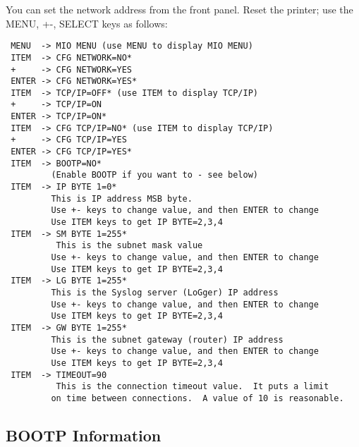 \documentclass[a4paper]{article}
\begin{document}
You can set the network address from the front panel.
Reset  the printer; use the MENU, +-, SELECT keys as follows:
\begin{tscreen}
\begin{verbatim}
 MENU  -> MIO MENU (use MENU to display MIO MENU)
 ITEM  -> CFG NETWORK=NO*
 +     -> CFG NETWORK=YES
 ENTER -> CFG NETWORK=YES*
 ITEM  -> TCP/IP=OFF* (use ITEM to display TCP/IP)
 +     -> TCP/IP=ON
 ENTER -> TCP/IP=ON*
 ITEM  -> CFG TCP/IP=NO* (use ITEM to display TCP/IP)
 +     -> CFG TCP/IP=YES
 ENTER -> CFG TCP/IP=YES*
 ITEM  -> BOOTP=NO*
         (Enable BOOTP if you want to - see below)
 ITEM  -> IP BYTE 1=0*
         This is IP address MSB byte.
         Use +- keys to change value, and then ENTER to change
         Use ITEM keys to get IP BYTE=2,3,4
 ITEM  -> SM BYTE 1=255*
          This is the subnet mask value
         Use +- keys to change value, and then ENTER to change
         Use ITEM keys to get IP BYTE=2,3,4
 ITEM  -> LG BYTE 1=255*
         This is the Syslog server (LoGger) IP address
         Use +- keys to change value, and then ENTER to change
         Use ITEM keys to get IP BYTE=2,3,4
 ITEM  -> GW BYTE 1=255*
         This is the subnet gateway (router) IP address
         Use +- keys to change value, and then ENTER to change
         Use ITEM keys to get IP BYTE=2,3,4
 ITEM  -> TIMEOUT=90
          This is the connection timeout value.  It puts a limit
         on time between connections.  A value of 10 is reasonable.
\end{verbatim}
\end{tscreen}



\subsection{BOOTP Information}
\end{document}
